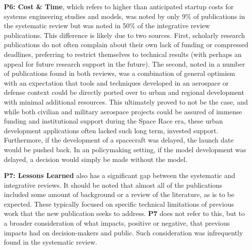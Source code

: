 \textbf{P6: Cost \& Time}, which refers to higher than anticipated startup costs for systems engineering studies and models, was noted by only 9\% of publications in the systematic review but was noted in 50\% of the integrative review publications. This difference is likely due to two sources. First, scholarly research publications do not often complain about their own lack of funding or compressed deadlines, preferring to restrict themselves to technical results (with perhaps an appeal for future research support in the future). The second, noted in a number of publications found in both reviews, was a combination of general optimism with an expectation that tools and techniques developed in an aerospace or defense context could be directly ported over to urban and regional development with minimal additional resources. This ultimately proved to not be the case, and while both civilian and military aerospace projects could be assured of immense funding and institutional support during the Space Race era, these urban development applications often lacked such long term, invested support. Furthermore, if the development of a spacecraft was delayed, the launch date would be pushed back. In an policymaking setting, if the model development was delayed, a decision would simply be made without the model.

\textbf{P7: Lessons Learned} also has a significant gap between the systematic and integrative reviews. It should be noted that almost all of the publications included some amount of background or a review of the literature, as is to be expected. These typically focused on specific technical limitations of previous work that the new publication seeks to address. \textbf{P7} does not refer to this, but to a broader consideration of what impacts, positive or negative, that previous impacts had on decision-makers and public. Such consideration was infrequently found in the systematic review. 

